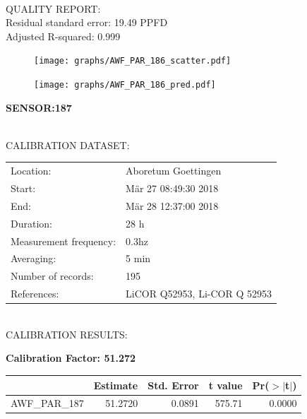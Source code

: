 \documentclass[oneside]{report}
\begin{document}
\hrulefill\\
QUALITY REPORT:\\
Residual standard error: 19.49 PPFD\\
Adjusted R-squared: 0.999



\begin{figure}[H]
  \centering
  \texttt{[image: graphs/AWF\_PAR\_186\_scatter.pdf]}
\end{figure}




\begin{figure}[H]
  \centering
  \texttt{[image: graphs/AWF\_PAR\_186\_pred.pdf]}
\end{figure}

\pagebreak


\begin{center}
\large{\textbf{SENSOR:187}}\\
\end{center}

\hrulefill\\
CALIBRATION DATASET:\\
\begin{table}[h!]
  \centering
  \label{tab:table1}
  \begin{tabular}{ll}
    Location: & Aboretum Goettingen\\ 
    
    
    Start:  & Mär 27 08:49:30 2018 \\
    End:   & Mär 28 12:37:00 2018\\ 
    Duration: & 28 h\\
    Measurement frequency: & 0.3hz\\
    Averaging:  &5 min\\
    Number of records: & 195 \\
    References: & LiCOR Q52953, Li-COR Q 52953 \\
  \end{tabular}
\end{table}

\hrulefill\\
CALIBRATION RESULTS:\\


\begin{center}
\textbf{\large{Calibration Factor: 51.272}}\\
\end{center}
\begin{table}[ht]
\centering
\begin{tabular}{rrrrr}
  \hline
 & Estimate & Std. Error & t value & Pr($>$$|$t$|$) \\ 
  \hline
AWF\_PAR\_187 & 51.2720 & 0.0891 & 575.71 & 0.0000 \\ 
   \hline
\end{tabular}
\end{table}
\end{document}
